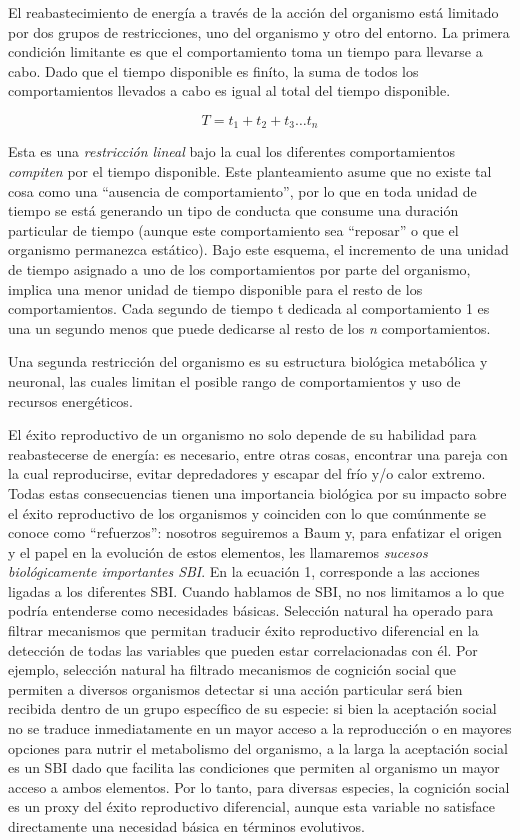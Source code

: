 \documentclass[
  letterpaper,
]{book}
\begin{document}
El reabastecimiento de energía a través de la acción del organismo está
limitado por dos grupos de restricciones, uno del organismo y otro del
entorno. La primera condición limitante es que el comportamiento toma un
tiempo para llevarse a cabo. Dado que el tiempo disponible es ﬁníto, la
suma de todos los comportamientos llevados a cabo es igual al total del
tiempo disponible.

\[
T = t_1 + t_2 + t_3 \dots t_n
\]

Esta es una \emph{restricción lineal} bajo la cual los diferentes
comportamientos \emph{compiten} por el tiempo disponible. Este
planteamiento asume que no existe tal cosa como una ``ausencia de
comportamiento'', por lo que en toda unidad de tiempo se está generando
un tipo de conducta que consume una duración particular de tiempo
(aunque este comportamiento sea ``reposar'' o que el organismo
permanezca estático). Bajo este esquema, el incremento de una unidad de
tiempo asignado a uno de los comportamientos por parte del organismo,
implica una menor unidad de tiempo disponible para el resto de los
comportamientos. Cada segundo de tiempo t dedicada al comportamiento 1
es una un segundo menos que puede dedicarse al resto de los \emph{n}
comportamientos.

Una segunda restricción del organismo es su estructura biológica
metabólica y neuronal, las cuales limitan el posible rango de
comportamientos y uso de recursos energéticos.

El éxito reproductivo de un organismo no solo depende de su habilidad
para reabastecerse de energía: es necesario, entre otras cosas,
encontrar una pareja con la cual reproducirse, evitar depredadores y
escapar del frío y/o calor extremo. Todas estas consecuencias tienen una
importancia biológica por su impacto sobre el éxito reproductivo de los
organismos y coinciden con lo que comúnmente se conoce como
``refuerzos'': nosotros seguiremos a Baum y, para enfatizar el origen y
el papel en la evolución de estos elementos, les llamaremos
\emph{sucesos biológicamente importantes SBI}. En la ecuación 1,
corresponde a las acciones ligadas a los diferentes SBI. Cuando hablamos
de SBI, no nos limitamos a lo que podría entenderse como necesidades
básicas. Selección natural ha operado para filtrar mecanismos que
permitan traducir éxito reproductivo diferencial en la detección de
todas las variables que pueden estar correlacionadas con él. Por
ejemplo, selección natural ha filtrado mecanismos de cognición social
que permiten a diversos organismos detectar si una acción particular
será bien recibida dentro de un grupo específico de su especie: si bien
la aceptación social no se traduce inmediatamente en un mayor acceso a
la reproducción o en mayores opciones para nutrir el metabolismo del
organismo, a la larga la aceptación social es un SBI dado que facilita
las condiciones que permiten al organismo un mayor acceso a ambos
elementos. Por lo tanto, para diversas especies, la cognición social es
un proxy del éxito reproductivo diferencial, aunque esta variable no
satisface directamente una necesidad básica en términos evolutivos.
\end{document}
